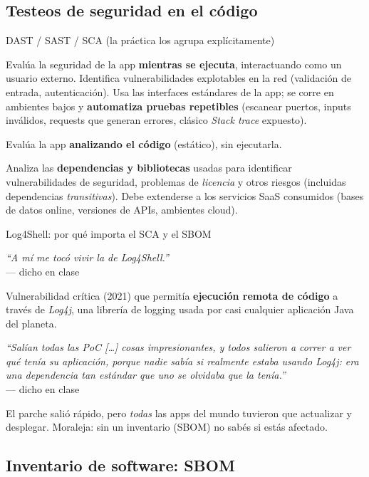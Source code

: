 \documentclass[11pt,a4paper]{article}
\newcommand{\prof}[1]{\par\medskip\noindent\textit{``#1''}\\[-2pt]\hspace*{1em}%
  {\footnotesize\textcolor{black!60}{--- dicho en clase}}\par\medskip\noindent}
\begin{document}
\subsection{Testeos de seguridad en el código}

\begin{practbox}{DAST / SAST / SCA (la práctica los agrupa explícitamente)}
\begin{description}[leftmargin=0pt,labelsep=0.4em,style=nextline,itemsep=2pt]
  \item[DAST — Dynamic Application Security Testing] Evalúa la seguridad de la app
        \textbf{mientras se ejecuta}, interactuando como un usuario externo. Identifica
        vulnerabilidades explotables en la red (validación de entrada, autenticación). Usa las
        interfaces estándares de la app; se corre en ambientes bajos y \textbf{automatiza
        pruebas repetibles} (escanear puertos, inputs inválidos, requests que generan errores,
        clásico \emph{Stack trace} expuesto).
  \item[SAST — Static Application Security Testing] Evalúa la app \textbf{analizando el código}
        (estático), sin ejecutarla.
  \item[SCA — Software Composition Analysis] Analiza las \textbf{dependencias y bibliotecas}
        usadas para identificar vulnerabilidades de seguridad, problemas de \emph{licencia} y
        otros riesgos (incluidas dependencias \emph{transitivas}). Debe extenderse a los
        servicios SaaS consumidos (bases de datos online, versiones de APIs, ambientes cloud).
\end{description}
\end{practbox}

\begin{anecbox}{Log4Shell: por qué importa el SCA y el SBOM}
\prof{A mí me tocó vivir la de Log4Shell.} Vulnerabilidad crítica (2021) que permitía
\textbf{ejecución remota de código} a través de \emph{Log4j}, una librería de logging usada por
casi cualquier aplicación Java del planeta. \prof{Salían todas las PoC [\dots] cosas
impresionantes, y todos salieron a correr a ver qué tenía su aplicación, porque nadie sabía si
realmente estaba usando Log4j: era una dependencia tan estándar que uno se olvidaba que la
tenía.} El parche salió rápido, pero \emph{todas} las apps del mundo tuvieron que actualizar y
desplegar. Moraleja: sin un inventario (SBOM) no sabés si estás afectado.
\end{anecbox}

\subsection{Inventario de software: SBOM}
\end{document}
